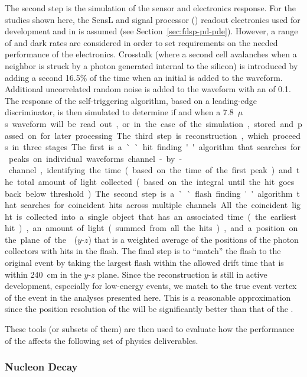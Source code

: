The second step is the simulation of the sensor and electronics response. For the studies shown here, the SensL  and  signal processor () readout electronics used for  development and in  is assumed (see Section~\ref{sec:fdsp-pd-pde}). However, a range of  and dark rates are considered in order to set requirements on the needed performance of the electronics.
Crosstalk (where a second cell avalanches when a neighbor is struck by a photon generated internal to the silicon) is introduced by adding a second \phel \num{16.5}\% of the time when an initial \phel is added to the waveform. Additional uncorrelated random noise is added to the waveform with an  of
\SI{0.1}{\phel{}}. The response of the  self-triggering algorithm, based on a leading-edge discriminator, is then simulated to determine if and when a \SI{7.8}{$\mu$s} waveform will be read out, or in the case of the simulation, 
stored and passed on for later processing.

The third step is reconstruction, which proceeds in three stages. The first is a ``hit finding'' algorithm that searches for peaks on individual waveforms channel-by-channel, identifying the time (based on the time of the first peak) and the total amount of light collected (based on the integral until the hit goes back below threshold). The second step is a ``flash finding'' algorithm that searches for coincident hits across multiple channels. All the coincident light is collected into a single object that has an associated time (the earliest hit), an amount of light (summed from all the hits), and a position on the plane of the  ($y$-$z$) that is a weighted average of the positions of the photon collectors with hits in the flash.  
The final step is to ``match'' the flash to the original event by taking the largest flash within the allowed drift time that is within \SI{240}{cm} in the $y$-$z$ plane. Since the  reconstruction is still in active development, especially for low-energy events, we match to the true event %
vertex of the event in the analyses presented here. This is a reasonable approximation since the position resolution of the  will be significantly better than that of the . 

These tools (or subsets of them) are then used to evaluate how the performance of the  affects the following set of physics deliverables.

\subsubsection{Nucleon Decay}
\label{subsec:fdsp-pd-simphys-ndk}

